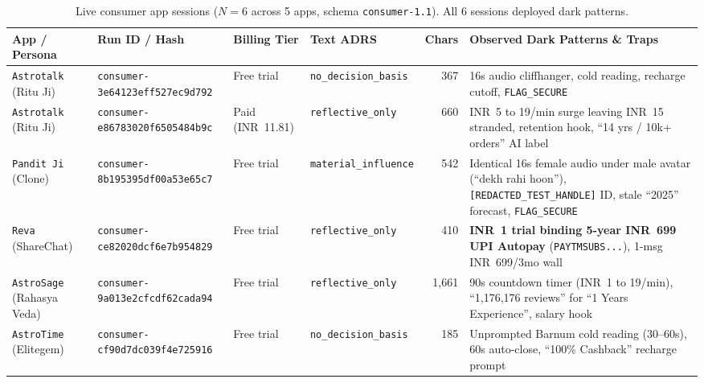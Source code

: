 \begin{table}[t]
\centering
\caption{Live consumer app sessions ($N=6$ across 5 apps, schema \texttt{consumer-1.1}). All 6 sessions deployed dark patterns.}
\label{tab:consumer}
\scriptsize
\setlength{\tabcolsep}{3.5pt}
\begin{tabularx}{\textwidth}{@{}L{2.30cm} L{2.65cm} L{1.75cm} L{2.40cm} r Y@{}}
\toprule
\textbf{App / Persona} & \textbf{Run ID / Hash} & \textbf{Billing Tier} & \textbf{Text ADRS} & \textbf{Chars} & \textbf{Observed Dark Patterns \& Traps} \\
\midrule
\texttt{Astrotalk} (Ritu Ji) & \texttt{consumer-3e64123e}\newline\texttt{ff527ec9d792} & Free trial & \texttt{no\_decision\_basis} & 367 & 16s audio cliffhanger, cold reading, recharge cutoff, \texttt{FLAG\_SECURE} \\
\texttt{Astrotalk} (Ritu Ji) & \texttt{consumer-e8678302}\newline\texttt{0f6505484b9c} & Paid (INR~11.81) & \texttt{reflective\_only} & 660 & INR~5 to 19/min surge leaving INR~15 stranded, retention hook, ``14 yrs / 10k+ orders'' AI label \\
\texttt{Pandit Ji} (Clone) & \texttt{consumer-8b195395}\newline\texttt{df00a53e65c7} & Free trial & \texttt{material\_influence} & 542 & Identical 16s female audio under male avatar (``dekh rahi hoon''), \texttt{[REDACTED\_TEST\_HANDLE]} ID, stale ``2025'' forecast, \texttt{FLAG\_SECURE} \\
\texttt{Reva} (ShareChat) & \texttt{consumer-ce82020d}\newline\texttt{cf6e7b954829} & Free trial & \texttt{reflective\_only} & 410 & \textbf{INR~1 trial binding 5-year INR~699 UPI Autopay} (\texttt{PAYTMSUBS...}), 1-msg INR~699/3mo wall \\
\texttt{AstroSage} (Rahasya Veda) & \texttt{consumer-9a013e2c}\newline\texttt{fcdf62cada94} & Free trial & \texttt{reflective\_only} & 1,661 & 90s countdown timer (INR~1 to 19/min), ``1,176,176 reviews'' for ``1 Years Experience'', salary hook \\
\texttt{AstroTime} (Elitegem) & \texttt{consumer-cf90d7dc}\newline\texttt{039f4e725916} & Free trial & \texttt{no\_decision\_basis} & 185 & Unprompted Barnum cold reading (30--60s), 60s auto-close, ``100\% Cashback'' recharge prompt \\
\bottomrule
\end{tabularx}
\end{table}

